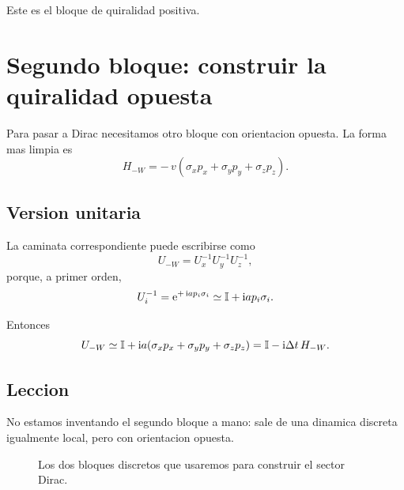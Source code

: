 Este es el bloque de quiralidad positiva.

\section{Segundo bloque: construir la quiralidad opuesta}
Para pasar a Dirac necesitamos otro bloque con orientacion opuesta. La forma mas limpia es
\begin{equation}
H_{-W} = -\,v(\sigma_x p_x+\sigma_y p_y+\sigma_z p_z).
\label{c08:eq:Hminus}
\end{equation}

\subsection{Version unitaria}
La caminata correspondiente puede escribirse como
\begin{equation}
U_{-W} = U_x^{-1} U_y^{-1} U_z^{-1},
\label{c08:eq:UmW}
\end{equation}
porque, a primer orden,
\begin{equation}
U_i^{-1} = \mathrm{e}^{+\,\mathrm{i} a p_i \sigma_i}
\simeq \mathbb{I} + \mathrm{i} a p_i \sigma_i.
\end{equation}

Entonces
\begin{equation}
U_{-W}\simeq \mathbb{I} + \mathrm{i} a(\sigma_x p_x+\sigma_y p_y+\sigma_z p_z)
= \mathbb{I} - \mathrm{i} \Delta t\,H_{-W}.
\end{equation}

\subsection{Leccion}
No estamos inventando el segundo bloque a mano: sale de una dinamica discreta igualmente local, pero con orientacion opuesta.

\begin{figure}[h!]
\centering
{}
\caption{Los dos bloques discretos que usaremos para construir el sector Dirac.}
\end{figure}

